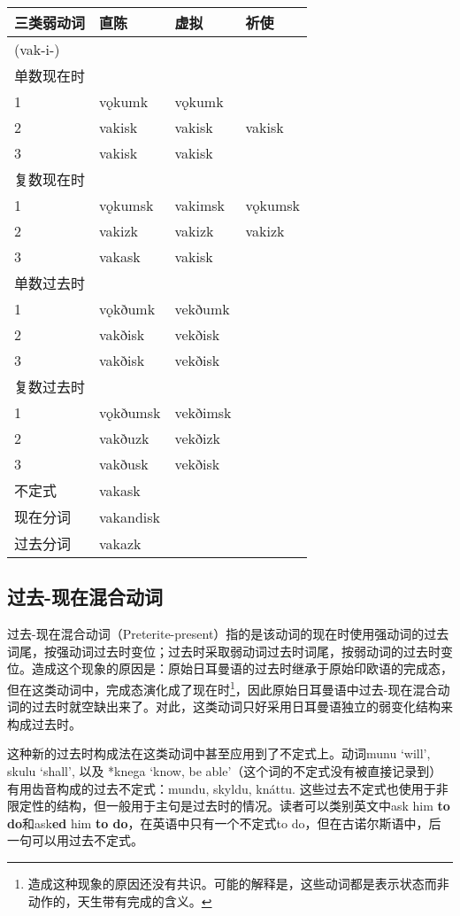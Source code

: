 \begin{longtable}{llll}
\toprule
三类弱动词 & 直陈 & 虚拟 & 祈使 \\
\midrule
\endhead
\bottomrule
\endfoot
(vak-i-) & & & \\
单数现在时 & & & \\
1 & vǫkumk & vǫkumk & \\
2 & vakisk & vakisk & vakisk \\
3 & vakisk & vakisk & \\
复数现在时 & & & \\
1 & vǫkumsk & vakimsk & vǫkumsk \\
2 & vakizk & vakizk & vakizk \\
3 & vakask & vakisk & \\
单数过去时 & & & \\
1 & vǫkðumk & vekðumk & \\
2 & vakðisk & vekðisk & \\
3 & vakðisk & vekðisk & \\
复数过去时 & & & \\
1 & vǫkðumsk & vekðimsk & \\
2 & vakðuzk & vekðizk & \\
3 & vakðusk & vekðisk & \\
不定式 & vakask & & \\
现在分词 & vakandisk & & \\
过去分词 & vakazk & & \\
\end{longtable}

\subsection{过去-现在混合动词}\label{ux8fc7ux53bb-ux73b0ux5728ux6df7ux5408ux52a8ux8bcd}

过去-现在混合动词（Preterite-present）指的是该动词的现在时使用强动词的过去词尾，按强动词过去时变位；过去时采取弱动词过去时词尾，按弱动词的过去时变位。造成这个现象的原因是：原始日耳曼语的过去时继承于原始印欧语的完成态，但在这类动词中，完成态演化成了现在时\footnote{造成这种现象的原因还没有共识。可能的解释是，这些动词都是表示状态而非动作的，天生带有完成的含义。}，因此原始日耳曼语中过去-现在混合动词的过去时就空缺出来了。对此，这类动词只好采用日耳曼语独立的弱变化结构来构成过去时。

这种新的过去时构成法在这类动词中甚至应用到了不定式上。动词munu `will‌',
skulu `shall‌', 以及 *knega `know, be
able‌'（这个词的不定式没有被直接记录到）有用齿音构成的过去不定式：mundu,
skyldu, knáttu.
这些过去不定式也使用于非限定性的结构，但一般用于主句是过去时的情况。读者可以类别英文中ask
him \textbf{to do}和ask\textbf{ed} him \textbf{to
do}，在英语中只有一个不定式to
do，但在古诺尔斯语中，后一句可以用过去不定式。

